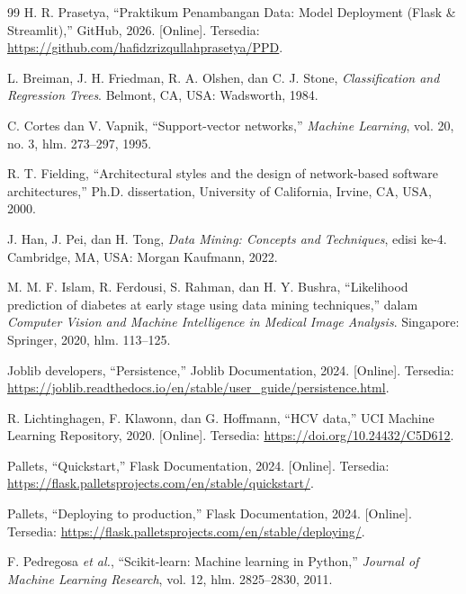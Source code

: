 \documentclass[a4paper,oneside,12pt]{report}
\begin{document}
\clearpage

\begin{thebibliography}{99}
	 H. R. Prasetya, ``Praktikum Penambangan Data: Model Deployment (Flask \& Streamlit),'' GitHub, 2026. [Online]. Tersedia: \url{https://github.com/hafidzrizqullahprasetya/PPD}.

	 L. Breiman, J. H. Friedman, R. A. Olshen, dan C. J. Stone, \textit{Classification and Regression Trees}. Belmont, CA, USA: Wadsworth, 1984.

	 C. Cortes dan V. Vapnik, ``Support-vector networks,'' \textit{Machine Learning}, vol. 20, no. 3, hlm. 273--297, 1995.

	 R. T. Fielding, ``Architectural styles and the design of network-based software architectures,'' Ph.D. dissertation, University of California, Irvine, CA, USA, 2000.

	 J. Han, J. Pei, dan H. Tong, \textit{Data Mining: Concepts and Techniques}, edisi ke-4. Cambridge, MA, USA: Morgan Kaufmann, 2022.

	 M. M. F. Islam, R. Ferdousi, S. Rahman, dan H. Y. Bushra, ``Likelihood prediction of diabetes at early stage using data mining techniques,'' dalam \textit{Computer Vision and Machine Intelligence in Medical Image Analysis}. Singapore: Springer, 2020, hlm. 113--125.

	 Joblib developers, ``Persistence,'' Joblib Documentation, 2024. [Online]. Tersedia: \url{https://joblib.readthedocs.io/en/stable/user_guide/persistence.html}.

	 R. Lichtinghagen, F. Klawonn, dan G. Hoffmann, ``HCV data,'' UCI Machine Learning Repository, 2020. [Online]. Tersedia: \url{https://doi.org/10.24432/C5D612}.

	 Pallets, ``Quickstart,'' Flask Documentation, 2024. [Online]. Tersedia: \url{https://flask.palletsprojects.com/en/stable/quickstart/}.

	 Pallets, ``Deploying to production,'' Flask Documentation, 2024. [Online]. Tersedia: \url{https://flask.palletsprojects.com/en/stable/deploying/}.

	 F. Pedregosa \textit{et al.}, ``Scikit-learn: Machine learning in Python,'' \textit{Journal of Machine Learning Research}, vol. 12, hlm. 2825--2830, 2011.


\end{thebibliography}
\end{document}
